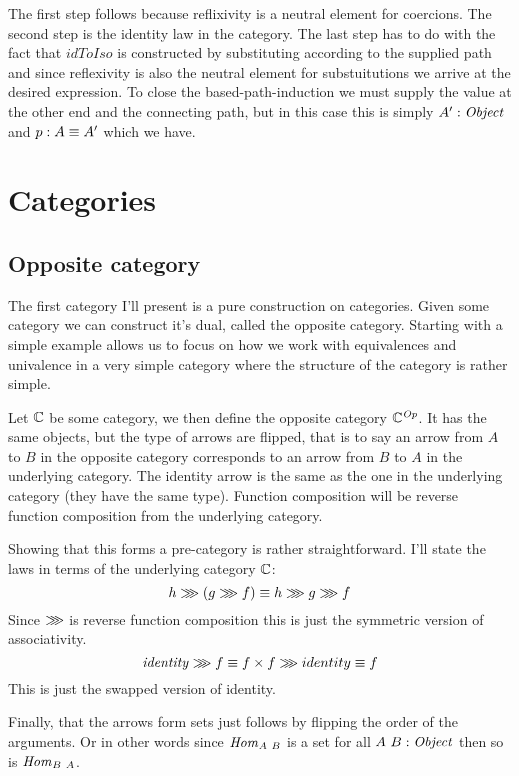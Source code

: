 %
The first step follows because reflixivity is a neutral element for coercions.
The second step is the identity law in the category. The last step has to do
with the fact that $\mathit{idToIso}$ is constructed by substituting according
to the supplied path and since reflexivity is also the neutral element for
substuitutions we arrive at the desired expression. To close the
based-path-induction we must supply the value at the other end and the
connecting path, but in this case this is simply $A' \;\mathord{:}\; \mathit{Object}$ and $p \;\mathord{:}\; A
\equiv A'$ which we have.
%
\section{Categories}
\subsection{Opposite category}
\label{op-cat}
The first category I'll present is a pure construction on categories. Given some
category we can construct it's dual, called the opposite category. Starting with
a simple example allows us to focus on how we work with equivalences and
univalence in a very simple category where the structure of the category is
rather simple.

Let $\mathbb{C}$ be some category, we then define the opposite category
$\mathbb{C}^{\mathit{Op}}$. It has the same objects, but the type of arrows are flipped,
that is to say an arrow from $A$ to $B$ in the opposite category corresponds to
an arrow from $B$ to $A$ in the underlying category. The identity arrow is the
same as the one in the underlying category (they have the same type). Function
composition will be reverse function composition from the underlying category.

Showing that this forms a pre-category is rather straightforward. I'll state the
laws in terms of the underlying category $\mathbb{C}$:
%
$$
h \ggg (g \ggg f) \equiv h \ggg g \ggg f
$$
%
Since $\ggg$ is reverse function composition this is just the symmetric version
of associativity.
%
$$
\mathit{identity} \ggg f \equiv f \times f \ggg identity \equiv f
$$
%
This is just the swapped version of identity.

Finally, that the arrows form sets just follows by flipping the order of the
arguments. Or in other words since $\mathit{Hom}_{A\ B}$ is a set for all $A\ B \;\mathord{:}\;
\mathit{Object}$ then so is $\Hom_{B\ A}$.

